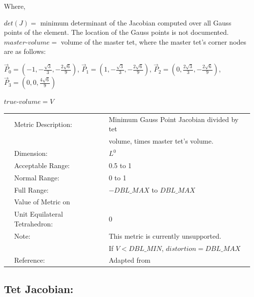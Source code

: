 \documentclass[12pt]{article}
\begin{document}
\begin{flushleft} Where, \end{flushleft}
$det(J) = $ minimum determinant of the Jacobian computed over all Gauss points  \newline
of the element.  The location of the Gauss points is not documented. \newline 
\newline
$master\textrm{-}volume =$ volume of the master tet, where the master tet's corner \newline
nodes are as follows: \newline


 $\vec P_0 = ( -1, -\frac {\sqrt{3}}{3}, -\frac{ 2\sqrt{6} }{9} )$, 
 $\vec P_1 = ( 1, -\frac{\sqrt{3}}{3},  -\frac{ 2\sqrt{6} }{9} )$,
 $\vec P_2 = ( 0, \frac{2\sqrt{3}}{3},   -\frac{ 2\sqrt{6} }{9} )$,
 $\vec P_3 = ( 0, 0,   \frac{ 4\sqrt{6} }{9} )$ \newline

\begin{flushleft}  
$true\textrm{-}volume = V $ \newline
\end{flushleft}  

\begin{tabular}{lll}
& Metric Description:  & Minimum Gauss Point Jacobian divided by tet \\
&                      & volume, times master tet's volume. \\ 
& Dimension:           & $L^0$       \\ 
& Acceptable Range:    & 0.5 to 1 \\ 
& Normal Range:        & 0 to 1 \\ 
& Full Range:          & $-DBL\_MAX$ to $DBL\_MAX$ \\ 
& Value of Metric on   &  \\
& Unit Equilateral Tetrahedron:    & 0 \\
& Note:                & This metric is currently unsupported. \\ 
&                      & If $V < DBL\_MIN$, $distortion = DBL\_MAX$ \\ 
& Reference:           & Adapted from \cite{four} \\
\end{tabular} 


\subsection*{Tet Jacobian:}
\end{document}
